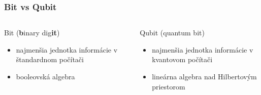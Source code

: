 \documentclass{beamer}
\begin{document}
\begin{frame}
	\frametitle{Bit vs Qubit}
	\begin{columns}[t]
		\begin{column}{.5\textwidth}
			\centering
			Bit (\textbf{b}inary dig\textbf{it})  
			\vspace{0.4cm} 
			\begin{itemize}
				\centering
				\item najmenšia jednotka informácie v štandardnom počítači
				\item booleovská algebra
				      
			\end{itemize}
		\end{column}
				      
		\begin{column}{.5\textwidth}
			\centering
			Qubit (quantum bit)
			\vspace{0.4cm}
			\begin{itemize}
				\centering
				\item najmenšia jednotka informácie v kvantovom počítači
				\item lineárna algebra nad Hilbertovým priestorom

			\end{itemize}		
		\end{column}
	\end{columns}
\end{frame}
\end{document}
